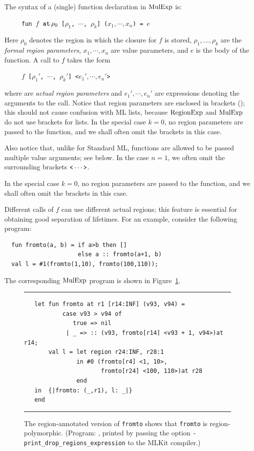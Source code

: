 \documentclass[12pt]{book}
\begin{document}
The syntax of a (single) function declaration in $\hbox{\rm MulExp}$ is:
\begin{tabbing}
\ \ \ \ \ \=\tt fun $f$ $\mathbin{\hbox{\tt at}}\,\rho_0$ [$\rho_1$, $\cdots$, $\rho_k$] ($x_1,\cdots,x_n$) = $e$
\end{tabbing}
Here $\rho_0$ denotes the region in which the closure for $f$ is
stored, $\rho_1, \ldots,\rho_k$ are the
%
{\em formal region parameters}, $x_1,\cdots,x_n$ are
value parameters, and $e$ is the body of the function.
A call to $f$ takes the form
\begin{tabbing}
\ \ \ \ \ \=\tt $f$  [$\rho_1'$, $\cdots$, $\rho_k'$] <$e_1',\cdots,e_n'$>
\end{tabbing}
where  are
%
{\em actual region parameters} and $e_1',\cdots,e_n'$ are expressions
denoting the arguments to the call. Notice that region parameters are
enclosed in brackets (\boxml{[ ]}); this should not cause confusion
with ML lists, because $\hbox{\rm RegionExp}$ and $\hbox{\rm MulExp}$ do not use
%
brackets for lists. In the special case $k=0$, no region parameters
are passed to the function, and we shall often omit the brackets in
this case.

Also notice that, unlike for Standard ML, functions are allowed to be
passed multiple value arguments; see below. In the case $n=1$, we
often omit the surrounding brackets $\verb+<+ \cdots \verb+>+$.

In the special case $k=0$, no region parameters are passed to the
function, and we shall often omit the brackets in this case.

Different calls of $f$ can use different actual regions; this feature
is essential for obtaining good separation of lifetimes.  For an
example, consider the following program:
\begin{verbatim}
  fun fromto(a, b) = if a>b then []
                     else a :: fromto(a+1, b)
  val l = #1(fromto(1,10), fromto(100,110));
\end{verbatim}
The corresponding $\hbox{\rm MulExp}$ program is shown in
Figure~\ref{fromto.fig}.
\begin{figure}[htb]
\hrule
\medskip
\begin{verbatim}
   let fun fromto at r1 [r14:INF] (v93, v94) =
           case v93 > v94 of
              true => nil
            | _ => :: (v93, fromto[r14] <v93 + 1, v94>)at r14;
       val l = let region r24:INF, r28:1
               in #0 (fromto[r4] <1, 10>,
                      fromto[r24] <100, 110>)at r28
               end
   in  {|fromto: (_,r1), l: _|}
   end
\end{verbatim}
\caption{The region-annotated version of {\tt fromto} shows that {\tt fromto}
  is region-polymorphic. (Program: , printed
  by passing the option {\tt -print\_drop\_regions\_expression} to the
  MLKit compiler.)}  \medskip

\hrule
\label{fromto.fig}
\end{figure}
\end{document}
